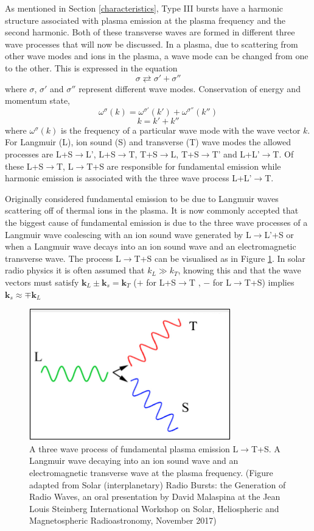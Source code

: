 As mentioned in Section \ref{characteristics}, Type III bursts have a harmonic structure associated with plasma emission at the plasma frequency and the second harmonic. Both of these transverse waves are formed in different three wave processes that will now be discussed.
In a plasma, due to scattering from other wave modes and ions in the plasma, a wave mode can be changed from one to the other. This is expressed in the equation 
$$ \sigma \rightleftarrows \sigma' + \sigma '' $$
where $\sigma$, $\sigma'$  and  $\sigma ''$ represent different wave modes. Conservation of energy and momentum state,
$$ \omega^{\sigma}(k)=\omega^{\sigma'}(k')+\omega^{\sigma''}(k'')$$
$$ k=k'+k''$$
where $ \omega^{\sigma}(k)$ is the frequency of a particular wave mode with the wave vector $k$. For Langmuir (L), ion sound (S) and transverse (T) wave modes the allowed processes are L+S$\rightarrow$L', L+S$\rightarrow$T,  T+S$\rightarrow$L,  T+S$\rightarrow$T' and  L+L'$\rightarrow$T. Of these L+S$\rightarrow$T,  L$\rightarrow$T+S are responsible for fundamental emission while harmonic emission is associated with the three wave process L+L'$\rightarrow$T.

Originally \cite{Ginzburg1958} considered fundamental emission to be due to Langmuir waves scattering off of thermal ions in the plasma. It is now commonly accepted that the biggest cause of fundamental emission is due to the three wave processes of a Langmuir wave coalescing with an ion sound wave generated by L$\rightarrow$L'+S or when a Langmuir wave decays into an ion sound wave and an electromagnetic transverse wave. The process L$\rightarrow$T+S can be visualised as in Figure \ref{fig:Femission}. In solar radio physics it is often assumed that $k_L \gg k_T$, knowing this and that the wave vectors must satisfy $\mathbf{k}_L \pm \mathbf{k}_s = \mathbf{k}_T$ ($+$ for L+S$\rightarrow$T , $-$ for L$\rightarrow$T+S) implies $\mathbf{k}_s \approx \mp \mathbf{k}_L$ 

\begin{figure}
\centering
\includegraphics[width=0.5\columnwidth]{Images/Fundamental_emission_Lwaves.png}
\caption[A three wave process of fundamental plasma emission L$\rightarrow$T+S]{A three wave process of fundamental plasma emission L$\rightarrow$T+S. A Langmuir wave decaying into an ion sound wave and an electromagnetic transverse wave at the plasma frequency. (Figure adapted from Solar (interplanetary) Radio Bursts: the Generation of Radio Waves,	an oral presentation by David Malaspina at the Jean Louis Steinberg International Workshop on Solar, Heliospheric and Magnetospheric Radioastronomy, November 2017)}
\label{fig:Femission}
\end{figure}

